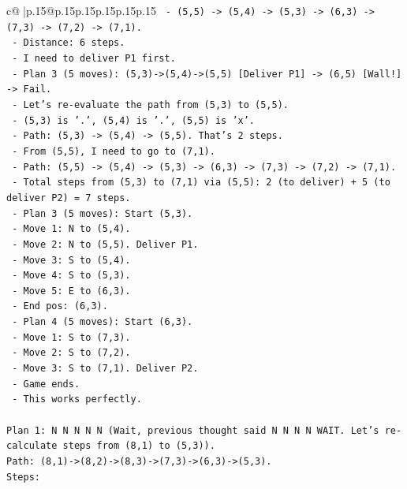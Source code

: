 \documentclass{article}
\begin{document}
{\begin{supertabular}{c@{$\;$}|p{.15\linewidth}@{}p{.15\linewidth}p{.15\linewidth}p{.15\linewidth}p{.15\linewidth}p{.15\linewidth}}
{{{\texttt{     {-} (5,5) {-}> (5,4) {-}> (5,3) {-}> (6,3) {-}> (7,3) {-}> (7,2) {-}> (7,1).} \\
\texttt{     {-} Distance: 6 steps.} \\
\texttt{     {-} I need to deliver P1 first.} \\
\texttt{     {-} Plan 3 (5 moves): (5,3){-}>(5,4){-}>(5,5) {[}Deliver P1{]} {-}> (6,5) {[}Wall!{]} {-}> Fail.} \\
\texttt{     {-} Let's re{-}evaluate the path from (5,3) to (5,5).} \\
\texttt{     {-} (5,3) is '.', (5,4) is '.', (5,5) is 'x'.} \\
\texttt{     {-} Path: (5,3) {-}> (5,4) {-}> (5,5). That's 2 steps.} \\
\texttt{     {-} From (5,5), I need to go to (7,1).} \\
\texttt{     {-} Path: (5,5) {-}> (5,4) {-}> (5,3) {-}> (6,3) {-}> (7,3) {-}> (7,2) {-}> (7,1).} \\
\texttt{     {-} Total steps from (5,3) to (7,1) via (5,5): 2 (to deliver) + 5 (to deliver P2) = 7 steps.} \\
\texttt{     {-} Plan 3 (5 moves): Start (5,3).} \\
\texttt{       {-} Move 1: N to (5,4).} \\
\texttt{       {-} Move 2: N to (5,5). Deliver P1.} \\
\texttt{       {-} Move 3: S to (5,4).} \\
\texttt{       {-} Move 4: S to (5,3).} \\
\texttt{       {-} Move 5: E to (6,3).} \\
\texttt{       {-} End pos: (6,3).} \\
\texttt{     {-} Plan 4 (5 moves): Start (6,3).} \\
\texttt{       {-} Move 1: S to (7,3).} \\
\texttt{       {-} Move 2: S to (7,2).} \\
\texttt{       {-} Move 3: S to (7,1). Deliver P2.} \\
\texttt{       {-} Game ends.} \\
\texttt{   {-} This works perfectly.} \\
\\ 
\texttt{Plan 1: N N N N N (Wait, previous thought said N N N N WAIT. Let's re{-}calculate steps from (8,1) to (5,3)).} \\
\texttt{Path: (8,1){-}>(8,2){-}>(8,3){-}>(7,3){-}>(6,3){-}>(5,3).} \\
\texttt{Steps:} \\
}}}
\end{supertabular}}
\end{document}
